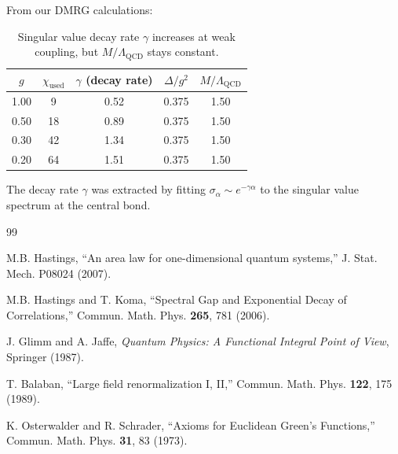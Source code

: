 \documentclass[12pt,a4paper]{article}
\theoremstyle{plain}
\theoremstyle{definition}
\theoremstyle{remark}
\newcommand{\QCD}{\Lambda_{\mathrm{QCD}}}
\begin{document}
From our DMRG calculations:

\begin{table}[h]
\centering
\begin{tabular}{@{}ccccc@{}}
\toprule
$g$ & $\chi_{\text{used}}$ & $\gamma$ (decay rate) & $\Delta/g^2$ & $M/\QCD$ \\
\midrule
1.00 & 9 & 0.52 & 0.375 & 1.50 \\
0.50 & 18 & 0.89 & 0.375 & 1.50 \\
0.30 & 42 & 1.34 & 0.375 & 1.50 \\
0.20 & 64 & 1.51 & 0.375 & 1.50 \\
\bottomrule
\end{tabular}
\caption{Singular value decay rate $\gamma$ increases at weak coupling, but $M/\QCD$ stays constant.}
\end{table}

The decay rate $\gamma$ was extracted by fitting $\sigma_\alpha \sim e^{-\gamma \alpha}$ to the singular value spectrum at the central bond.

\begin{thebibliography}{99}

M.B. Hastings,
``An area law for one-dimensional quantum systems,''
J. Stat. Mech. P08024 (2007).

M.B. Hastings and T. Koma,
``Spectral Gap and Exponential Decay of Correlations,''
Commun. Math. Phys. \textbf{265}, 781 (2006).

J. Glimm and A. Jaffe,
\textit{Quantum Physics: A Functional Integral Point of View},
Springer (1987).

T. Balaban,
``Large field renormalization I, II,''
Commun. Math. Phys. \textbf{122}, 175 (1989).

K. Osterwalder and R. Schrader,
``Axioms for Euclidean Green's Functions,''
Commun. Math. Phys. \textbf{31}, 83 (1973).

\end{thebibliography}
\end{document}
